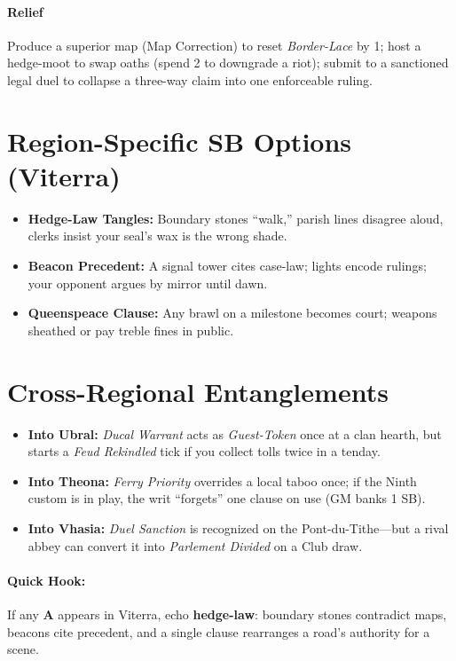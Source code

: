 \paragraph{Relief} Produce a superior map (Map Correction) to reset \emph{Border-Lace} by 1; host a hedge-moot to swap oaths (spend 2 \Boons{} to downgrade a riot); submit to a sanctioned legal duel to collapse a three-way claim into one enforceable ruling.

\medskip

\section*{Region-Specific SB Options (Viterra)}
\begin{itemize}
\item \textbf{Hedge-Law Tangles:} Boundary stones “walk,” parish lines disagree aloud, clerks insist your seal’s wax is the wrong shade.
\item \textbf{Beacon Precedent:} A signal tower cites case-law; lights encode rulings; your opponent argues by mirror until dawn.
\item \textbf{Queenspeace Clause:} Any brawl on a milestone becomes court; weapons sheathed or pay treble fines in public.
\end{itemize}

\section*{Cross-Regional Entanglements}
\begin{itemize}
\item \textbf{Into Ubral:} \emph{Ducal Warrant} acts as \emph{Guest-Token} once at a clan hearth, but starts a \emph{Feud Rekindled} tick if you collect tolls twice in a tenday.
\item \textbf{Into Theona:} \emph{Ferry Priority} overrides a local taboo once; if the Ninth custom is in play, the writ “forgets” one clause on use (GM banks 1 SB).
\item \textbf{Into Vhasia:} \emph{Duel Sanction} is recognized on the Pont-du-Tithe—but a rival abbey can convert it into \emph{Parlement Divided} on a Club draw.
\end{itemize}

\paragraph*{Quick Hook:} If any \textbf{A} appears in Viterra, echo \textbf{hedge-law}: boundary stones contradict maps, beacons cite precedent, and a single clause rearranges a road’s authority for a scene.